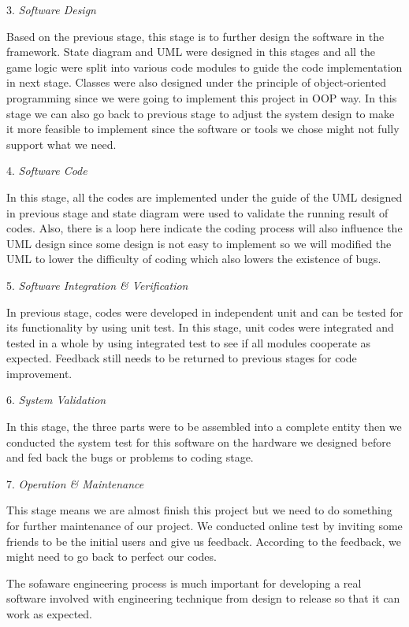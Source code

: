 \documentclass[a4paper,11pt]{article}
\begin{document}
3.	\emph{Software Design}

Based on the previous stage, this stage is to further design the software in the framework. State diagram and UML were designed in this stages and all the game logic were split into various code modules to guide the code implementation in next stage. Classes were also designed under the principle of object-oriented programming since we were going to implement this project in OOP way. In this stage we can also go back to previous stage to adjust the system design to make it more feasible to implement since the software or tools we chose might not fully support what we need.

4.	\emph{Software Code}

In this stage, all the codes are implemented under the guide of the UML designed in previous stage and state diagram were used to validate the running result of codes. Also, there is a loop here indicate the coding process will also influence the UML design since some design is not easy to implement so we will modified the UML to  lower the difficulty of coding which also lowers the existence of bugs.

5.	\emph{Software Integration \& Verification}

In previous stage, codes were developed in independent unit and can be tested for its functionality by using unit test. In this stage, unit codes were integrated and tested in a whole by using integrated test to see if all modules cooperate as expected. Feedback still needs to be returned to previous stages for code improvement.

6.	\emph{System Validation}

In this stage, the three parts were to be assembled into a complete entity then we conducted the system test for this software on the hardware we designed before and fed back the bugs or problems to coding stage.

7.	\emph{Operation \& Maintenance}

This stage means we are almost finish this project but we need to do something for further maintenance of our project. We conducted online test by inviting some friends to be the initial users and give us feedback. According to the feedback, we might need to go back to perfect our codes.

The sofaware engineering process is much important for developing a real software involved with engineering technique from design to release so that it can work as expected.
\end{document}
